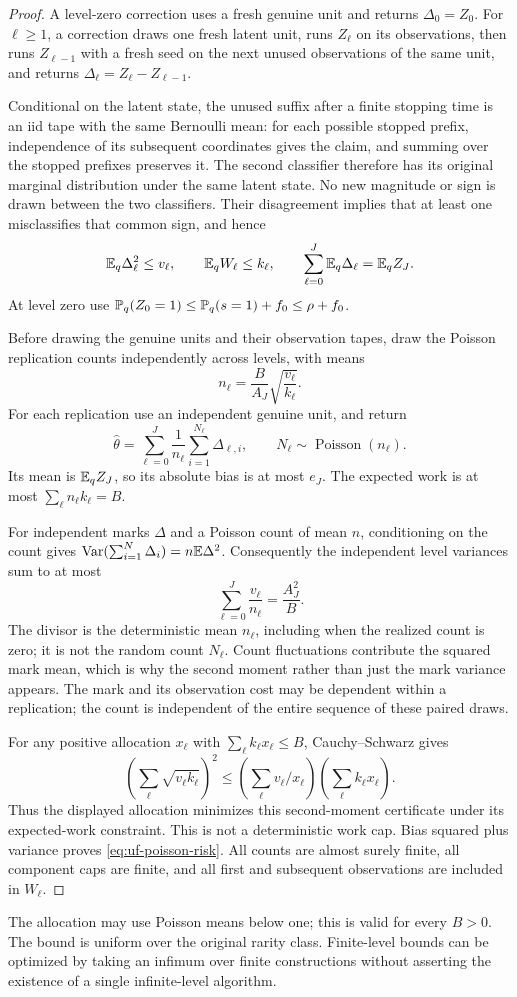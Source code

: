 \begin{proof}
A level-zero correction uses a fresh genuine unit and returns
$\Delta_0=Z_0$. For $\ell\ge1$, a correction draws one fresh latent unit,
runs $Z_\ell$ on its observations, then runs $Z_{\ell-1}$ with a fresh
seed on the next unused observations of the same unit, and returns
$\Delta_\ell=Z_\ell-Z_{\ell-1}$.

Conditional on the latent state, the unused suffix after a finite
stopping time is an iid tape with the same Bernoulli mean: for each
possible stopped prefix, independence of its subsequent coordinates
gives the claim, and summing over the stopped prefixes preserves it.
The second classifier therefore has its original marginal distribution
under the same latent state. No new magnitude or sign is drawn between
the two classifiers. Their disagreement implies that at least one
misclassifies that common sign, and hence
\[
 \mathbb E_q\Delta_\ell^2\le v_\ell,\qquad
 \mathbb E_q W_\ell\le k_\ell,\qquad
 \sum_{\ell=0}^J\mathbb E_q\Delta_\ell=\mathbb E_qZ_J.
\]
At level zero use
$\mathbb P_q(Z_0=1)\le\mathbb P_q(s=1)+f_0\le\rho+f_0$.

Before drawing the genuine units and their observation tapes, draw
the Poisson replication counts independently across levels, with means
\[
 n_\ell=\frac B{A_J}\sqrt{\frac{v_\ell}{k_\ell}}.
\]
For each replication use an independent genuine unit, and return
\[
 \widehat\theta
 =\sum_{\ell=0}^J\frac1{n_\ell}
       \sum_{i=1}^{N_\ell}\Delta_{\ell,i},
 \qquad N_\ell\sim\operatorname{Poisson}(n_\ell).
\]
Its mean is $\mathbb E_qZ_J$, so its absolute bias is at most $e_J$.
The expected work is at most
$\sum_\ell n_\ell k_\ell=B$.

For independent marks $\Delta$ and a Poisson count of mean $n$,
conditioning on the count gives
$\operatorname{Var}(\sum_{i=1}^{N}\Delta_i)=n\mathbb E\Delta^2$.
Consequently the independent level variances sum to at most
\[
 \sum_{\ell=0}^J\frac{v_\ell}{n_\ell}=\frac{A_J^2}{B}.
\]
The divisor is the deterministic mean $n_\ell$, including when the
realized count is zero; it is not the random count $N_\ell$. Count
fluctuations contribute the squared mark mean, which is why the second
moment rather than just the mark variance appears. The mark and its
observation cost may be dependent within a replication; the count is
independent of the entire sequence of these paired draws.

For any positive allocation $x_\ell$ with $\sum_\ell k_\ell x_\ell\le B$,
Cauchy--Schwarz gives
\[
 \left(\sum_\ell\sqrt{v_\ell k_\ell}\right)^2
 \le\left(\sum_\ell v_\ell/x_\ell\right)
       \left(\sum_\ell k_\ell x_\ell\right).
\]
Thus the displayed allocation minimizes this second-moment certificate
under its expected-work constraint. This is not a deterministic work cap.
Bias squared plus variance proves \eqref{eq:uf-poisson-risk}.
All counts are almost surely finite, all component caps are finite,
and all first and subsequent observations are included in $W_\ell$.
\end{proof}

The allocation may use Poisson means below one; this is valid for
every $B>0$. The bound is uniform over the original rarity class.
Finite-level bounds can be optimized by taking an infimum over
finite constructions without asserting the existence of a single
infinite-level algorithm.

